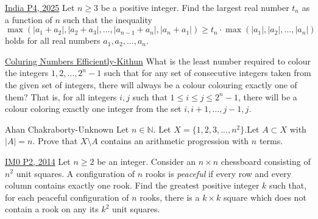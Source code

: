 \begin{problem}{5}{\href{}{India P4, 2025}}
	Let $n\ge 3$ be a positive integer. Find the largest real number $t_n$ as a function of $n$ such that the inequality
\[\max\left(|a_1+a_2|, |a_2+a_3|, \dots ,|a_{n-1}+a_{n}| , |a_n+a_1|\right) \ge t_n \cdot \max(|a_1|,|a_2|, \dots ,|a_n|)\]holds for all real numbers $a_1, a_2, \dots , a_n$.
\end{problem}


\begin{problem}{6}{\href{https://artofproblemsolving.com/community/c6h2718707p34335433}{Coluring Numbers Efficiently-Kithun}}
	What is the least number required to colour the integers $1, 2,\ldots,2^{n}-1$ such that for any set of consecutive integers taken from the given set of integers, there will always be a colour colouring exactly one of them? That is, for all integers $i, j$ such that $1\le i\le j\le 2^{n}-1$, there will be a colour coloring exactly one integer from the set $i, i+1,\ldots, j-1, j$.
\end{problem}


\begin{problem}{7}{Ahan Chakraborty-Unknown}
	Let $n\in \mathbb{N}$. Let $X=\{1,2,3,...,n^2\}.$Let $A\subset X$ with $|A| = n$. Prove that $X\setminus A$ contains an arithmetic progression with $n$ terms.
\end{problem}


\begin{problem}{8}{\href{}{IM0 P2, 2014}}
	Let $n\ge 2$ be an integer. Consider an $n\times n$ chessboard consisting of $n^2$ unit squares. A configuration of $n$ rooks is \emph{peaceful} if every row and every column contains exactly one rook. Find the greatest positive integer $k$ such that, for each peaceful configuration of $n$ rooks, there is a $k\times k$ square which does not contain a rook on any its $k^2$ unit squares.
\end{problem}


\newpage
